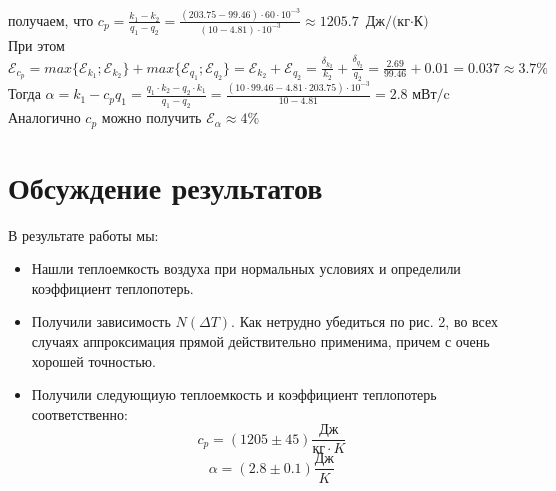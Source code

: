 \documentclass[a4paper, 10pt, twocolumn]{article}
\begin{document}
    получаем, что $c_p = \frac{k_1 - k_2}{q_1 - q_2} = \frac{(203.75 - 99.46) \cdot 60 \cdot 10^{-3}}{(10 - 4.81) \cdot 10^{-3}}
     \approx 1205.7 \text{ Дж/(кг$\cdot$К)}$ \\
    При этом $\mathcal{E}_{c_p} = max\{\mathcal{E}_{k_1}; \mathcal{E}_{k_2}\} + max\{\mathcal{E}_{q_1}; \mathcal{E}_{q_2}\}
     = \mathcal{E}_{k_2} + \mathcal{E}_{q_2} = \frac{\delta_{k_2}}{k_2} + \frac{\delta_{q_2}}{q_2} =
     \frac{2.69}{99.46} + 0.01 = 0.037 \approx 3.7\%$ \\
    Тогда $\alpha = k_1 - c_{p}q_1 = \frac{q_1 \cdot k_2 - q_2 \cdot k_1}{q_1 - q_2} =
     \frac{(10 \cdot 99.46 - 4.81 \cdot 203.75) \cdot 10^{-3}}{10-4.81} = 2.8 \text{ мВт/c}$ \\
    Аналогично $c_p$ можно получить $\mathcal{E}_\alpha \approx 4\%$
\section{Обсуждение результатов}
    В результате работы мы:
    \begin{itemize}
        \item Нашли теплоемкость воздуха при нормальных условиях и определили коэффициент теплопотерь.
    
        \item Получили зависимость $N(\Delta T)$. Как нетрудно убедиться по рис. 2,
        во всех случаях аппроксимация прямой действительно применима, причем с очень
        хорошей точностью.

        \item Получили следующиую теплоемкость и коэффициент теплопотерь соответственно:
        $$c_p = (1205 \pm 45)\frac{\text{Дж}}{\text{кг} \cdot K}$$
        $$\alpha = (2.8 \pm 0.1)\frac{\text{Дж}}{K}$$
    \end{itemize}
\end{document}
